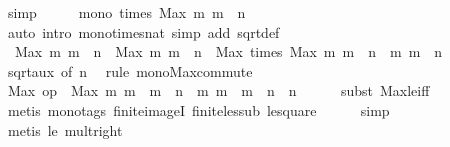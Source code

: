 \begin{isabellebody}
\ simp\isanewline
\ \ \isamarkupfalse%
\ \isamarkupfalse%
\ {\isachardoublequoteopen}mono\ {\isacharparenleft}times\ {\isacharparenleft}Max\ {\isacharbraceleft}m{\isachardot}\ m\ {\isasymle}\ n{\isacharbraceright}{\isacharparenright}{\isacharparenright}{\isachardoublequoteclose}\ \isamarkupfalse%
\ {\isacharparenleft}auto\ intro{\isacharcolon}\ mono{\isacharunderscore}times{\isacharunderscore}nat\ simp\ add{\isacharcolon}\ sqrt{\isacharunderscore}def{\isacharparenright}\isanewline
\ \ \isamarkupfalse%
\ \isamarkupfalse%
\ {\isacharasterisk}{\isacharcolon}\ {\isachardoublequoteopen}Max\ {\isacharbraceleft}m{\isachardot}\ m\ {\isasymle}\ n{\isacharbraceright}\ {\isacharasterisk}\ Max\ {\isacharbraceleft}m{\isachardot}\ m\ {\isasymle}\ n{\isacharbraceright}\ {\isacharequal}\ Max\ {\isacharparenleft}times\ {\isacharparenleft}Max\ {\isacharbraceleft}m{\isachardot}\ m\ {\isasymle}\ n{\isacharbraceright}{\isacharparenright}\ {\isacharbackquote}\ {\isacharbraceleft}m{\isachardot}\ m\ {\isasymle}\ n{\isacharbraceright}{\isacharparenright}{\isachardoublequoteclose}\isanewline
\ \ \ \ \isamarkupfalse%
\ sqrt{\isacharunderscore}aux\ {\isacharbrackleft}of\ n{\isacharbrackright}\ \isamarkupfalse%
\ {\isacharparenleft}rule\ mono{\isacharunderscore}Max{\isacharunderscore}commute{\isacharparenright}\isanewline
\ \ \isamarkupfalse%
\ {\isachardoublequoteopen}Max\ {\isacharparenleft}op\ {\isacharasterisk}\ {\isacharparenleft}Max\ {\isacharbraceleft}m{\isachardot}\ m\ {\isacharasterisk}\ m\ {\isasymle}\ n{\isacharbraceright}{\isacharparenright}\ {\isacharbackquote}\ {\isacharbraceleft}m{\isachardot}\ m\ {\isacharasterisk}\ m\ {\isasymle}\ n{\isacharbraceright}{\isacharparenright}\ {\isasymle}\ n{\isachardoublequoteclose}\isanewline
\ \ \ \ \isamarkupfalse%
\ {\isacharparenleft}subst\ Max{\isacharunderscore}le{\isacharunderscore}iff{\isacharparenright}\isanewline
\ \ \ \ \isamarkupfalse%
\ {\isacharparenleft}metis\ {\isacharparenleft}mono{\isacharunderscore}tags{\isacharparenright}\ finite{\isacharunderscore}imageI\ finite{\isacharunderscore}less{\isacharunderscore}ub\ le{\isacharunderscore}square{\isacharparenright}\isanewline
\ \ \ \ \isamarkupfalse%
\ simp\isanewline
\ \ \ \ \isamarkupfalse%
\ {\isacharparenleft}metis\ le{}\ mult{\isacharunderscore}{}{\isacharunderscore}right{\isacharparenright}\isanewline

\end{isabellebody}
